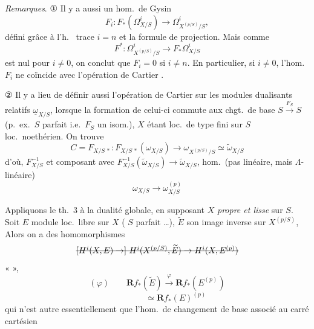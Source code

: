 \documentclass[11pt,a4paper]{article}
\begin{document}
\emph{Remarques}. ① Il y a aussi un hom.\ de Gysin
\[
F_{i} : F_{*}(\Omega^{i}_{X/S}) \to \Omega^{i}_{X^{(p/S)}/S} ,
\]
défini grâce à l'h.\   trace  $i = n$ et la formule de projection.
 Mais comme
\[
F^{*} : \Omega^{i}_{X^{(p/S)}/S} \to F_{*}\Omega^{i}_{X/S}
\]
est nul pour $i \neq 0$, on conclut que $F_{i} = 0$ si $i \neq n$. En particulier, si $i \neq 0$, l'hom.\ $F_{i}$ ne coïncide  avec l'opération de Cartier .

② Il y a lieu de définir aussi l'opération de Cartier \struck{\ill{}} sur les modules dualisants relatifs $\underline{\omega}_{X/S}$,  lorsque la formation de celui-ci commute aux chgt.\ de base $S \xrightarrow{F_{S}} S$ (p.\ ex.\ $S$ parfait i.e.\ $F_{S}$ un isom.), \struck{\ill{}} $X$ étant loc.\ de type fini sur $S$ loc.\ noethérien. On trouve
\[
C = F_{X/S\,*} : F_{X/S\,*}(\omega_{X/S}) \to \omega_{X^{(p/S)}/S} \simeq \widetilde{\omega}_{X/S}
\]
d'où,   $F^{-1}_{X/S}$ et composant avec $F^{-1}_{X/S}(\widetilde{\omega}_{X/S}) \to \widetilde{\omega}_{X/S}$,  hom.\ (pas linéaire, mais $\Lambda$-linéaire)
\[
\omega_{X/S} \to \omega^{(p)}_{X/S}
\]

Appliquons le th.~3 à la dualité globale, en supposant $X$ \emph{propre et lisse} sur $S$. Soit $E$ module loc.\ libre sur $X$ (  $S$ parfait …), $\widetilde{E}$ son image inverse sur $X^{(p/S)}$,  Alors on a des homomorphismes
\[
\text{\struck{$[H^{i}(X, E) \to]\ H^{i}(X^{(p/S)}, \widetilde{E}) \to H^{i}(X, E^{(p)})$}}
\]
 «   »,
\[
(\varphi) \qquad \mathbf{R}f_{*}(\widetilde{E}) \xrightarrow{\ \varphi\ } \mathbf{R}f_{*}(E^{(p)})
\]
\[
\phantom{(\varphi) \qquad} \simeq \mathbf{R}f_{*}(E)^{(p)}
\]
qui n'est autre essentiellement que l'hom.\ de changement de base associé au carré cartésien

\end{document}
